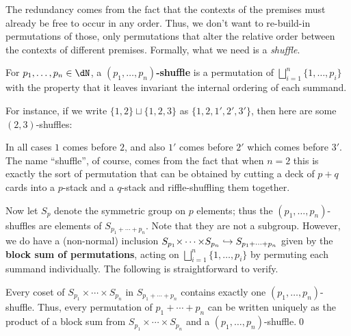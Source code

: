The redundancy comes from the fact that the contexts of the premises must already be free to occur in any order.
Thus, we don't want to re-build-in permutations of those, only permutations that alter the relative order between the contexts of different premises.
Formally, what we need is a \emph{shuffle}.

\begin{defn}
  For $p_1,\dots,p_n \in \dN$, a \textbf{$(p_1,\dots,p_n)$-shuffle} is a permutation of $\bigsqcup_{i=1}^n\{1,\dots,p_i\}$ with the property that it leaves invariant the internal ordering of each summand.
\end{defn}

For instance, if we write $\{1,2\}\sqcup \{1,2,3\}$ as $\{1,2,1',2',3'\}$, then here are some $(2,3)$-shuffles:
In all cases $1$ comes before $2$, and also $1'$ comes before $2'$ which comes before $3'$.
The name ``shuffle'', of course, comes from the fact that when $n=2$ this is exactly the sort of permutation that can be obtained by cutting a deck of $p+q$ cards into a $p$-stack and a $q$-stack and riffle-shuffling them together.

Now let $S_p$ denote the symmetric group on $p$ elements; thus the $(p_1,\dots,p_n)$-shuffles are elements of $S_{p_1+\cdots+p_n}$.
Note that they are not a subgroup.
However, we do have a (non-normal) inclusion $S_{p_1}\times \cdots\times S_{p_n} \into S_{p_1+\cdots+p_n}$ given by the \textbf{block sum of permutations}, acting on $\bigsqcup_{i=1}^n\{1,\dots,p_i\}$ by permuting each summand individually.
The following is straightforward to verify.

\begin{lem}
  Every coset of $S_{p_1}\times \cdots \times S_{p_n}$ in $S_{p_1+\cdots+p_n}$ contains exactly one $(p_1,\dots,p_n)$-shuffle.
  Thus, every permutation of $p_1+\cdots+p_n$ can be written uniquely as the product of a block sum from $S_{p_1}\times \cdots \times S_{p_n}$ and a $(p_1,\dots,p_n)$-shuffle.\qed
\end{lem}

